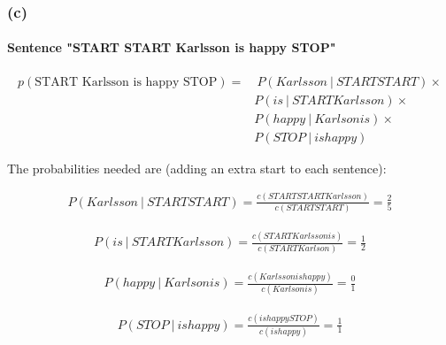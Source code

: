 \documentclass{article}
\newcommand\given[1][]{\:#1\vert\:}
\begin{document}
\subsubsection*{(c)}

\paragraph{Sentence "START START Karlsson is happy STOP"}

\begin{equation*}
    \begin{split}
    p(\text{START Karlsson is happy STOP}) =&\ P(Karlsson \given START
START) \times \\
    & P(is \given START
Karlsson) \times \\
    & P(happy \given Karlson
is) \times \\
    & P(STOP \given is
happy)
    \end{split}
\end{equation*}

The probabilities needed are (adding an extra start to each sentence):

\begin{equation*}
    \begin{split}
    P(Karlsson \given START
START) = \frac{c(START
START
Karlsson)}{ c(START
START)} = \frac{2}{5}
    \end{split}
\end{equation*}

\begin{equation*}
    \begin{split}
    P(is \given START
Karlsson) = \frac{c(START
Karlsson
is)}{ c(START
Karlson)} = \frac{1}{2}
    \end{split}
\end{equation*}

\begin{equation*}
    \begin{split}
    P(happy \given Karlson
is) = \frac{c(Karlsson
is
happy)}{ c(Karlson
is)} = \frac{0}{1}
    \end{split}
\end{equation*}

\begin{equation*}
    \begin{split}
    P(STOP \given is
happy) = \frac{c(is
happy
STOP)}{c(is
happy)} = \frac{1}{1}
    \end{split}
\end{equation*}
\end{document}
